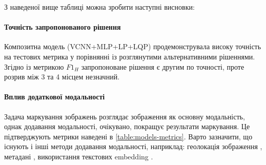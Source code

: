 \documentclass{udstu}
\begin{document}
\begin{center}
\label{table:models-metrics}
\end{center}

З наведеної вище таблиці можна зробити наступні висновки:

\paragraph{\textbf{Точність запропонованого рішення}}
Композитна модель (VCNN+MLP+LP+LQP) продемонструвала високу точність на тестових метрика у порівнянні
із розглянутими альтернативними рішеннями. Згідно із метрикою $F1_H$ запропоноване рішення є другим по точності,
проте розрив між 3 та 4 місцем незначний.

\paragraph{\textbf{Вплив додаткової модальності}}
Задача маркування зображень розглядає зображення як основну модальність, однак додавання модальності,
очікувано, покращує результати маркування. Це підтверджують метрики наведені в \tablename{ \ref{table:models-metrics}}.
Варто зазначити, що існують і інші методи додавання модальності, наприклад: геолокація зображення
\cite{cnn-side-3}, метадані \cite{cnn-side-1}, використання текстових embedding \cite{cnn-semantic-2}.
\end{document}
